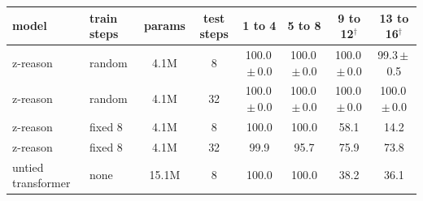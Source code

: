 \begin{tabular}{llcccccc}
\toprule
model & train steps & params & test steps & 1 to 4 & 5 to 8 & 9 to 12$^\dagger$ & 13 to 16$^\dagger$ \\
\midrule
z-reason & random & 4.1M & 8 & 100.0\,$\pm$\,0.0 & 100.0\,$\pm$\,0.0 & 100.0\,$\pm$\,0.0 & 99.3\,$\pm$\,0.5 \\
z-reason & random & 4.1M & 32 & 100.0\,$\pm$\,0.0 & 100.0\,$\pm$\,0.0 & 100.0\,$\pm$\,0.0 & 100.0\,$\pm$\,0.0 \\
z-reason & fixed 8 & 4.1M & 8 & 100.0 & 100.0 & 58.1 & 14.2 \\
z-reason & fixed 8 & 4.1M & 32 & 99.9 & 95.7 & 75.9 & 73.8 \\
untied transformer & none & 15.1M & 8 & 100.0 & 100.0 & 38.2 & 36.1 \\
\bottomrule
\end{tabular}
